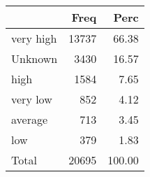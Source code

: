 
\begin{tabular}[t]{lrr}
\toprule
  & Freq & Perc\\
\midrule
very high & 13737 & 66.38\\
Unknown & 3430 & 16.57\\
high & 1584 & 7.65\\
very low & 852 & 4.12\\
average & 713 & 3.45\\
\addlinespace
low & 379 & 1.83\\
Total & 20695 & 100.00\\
\bottomrule
\end{tabular}